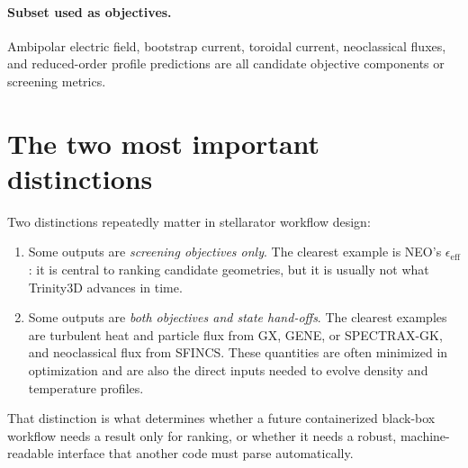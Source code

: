 \documentclass[11pt]{article}
\begin{document}
\paragraph{Subset used as objectives.}
Ambipolar electric field, bootstrap current, toroidal current, neoclassical
fluxes, and reduced-order profile predictions are all candidate objective
components or screening metrics.

\section{The two most important distinctions}

Two distinctions repeatedly matter in stellarator workflow design:

\begin{enumerate}
  \item Some outputs are \emph{screening objectives only}. The clearest example
  is NEO's \(\epsilon_{\mathrm{eff}}\): it is central to ranking candidate
  geometries, but it is usually not what Trinity3D advances in time.
  \item Some outputs are \emph{both objectives and state hand-offs}. The
  clearest examples are turbulent heat and particle flux from GX, GENE, or
  SPECTRAX-GK, and neoclassical flux from SFINCS. These quantities are often
  minimized in optimization and are also the direct inputs needed to evolve
  density and temperature profiles.
\end{enumerate}

That distinction is what determines whether a future containerized black-box
workflow needs a result only for ranking, or whether it needs a robust,
machine-readable interface that another code must parse automatically.



\end{document}

